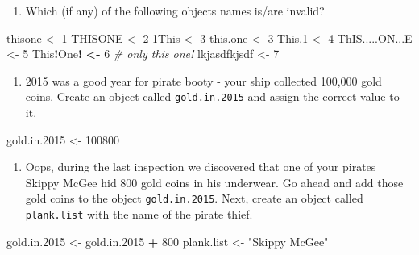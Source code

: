 \documentclass[]{book}
\newenvironment{Shaded}{\begin{snugshade}}{\end{snugshade}}
\newcommand{\DecValTok}[1]{\textcolor[rgb]{0.00,0.00,0.81}{#1}}
\newcommand{\StringTok}[1]{\textcolor[rgb]{0.31,0.60,0.02}{#1}}
\newcommand{\CommentTok}[1]{\textcolor[rgb]{0.56,0.35,0.01}{\textit{#1}}}
\newcommand{\OperatorTok}[1]{\textcolor[rgb]{0.81,0.36,0.00}{\textbf{#1}}}
\newcommand{\ErrorTok}[1]{\textcolor[rgb]{0.64,0.00,0.00}{\textbf{#1}}}
\newcommand{\NormalTok}[1]{#1}
\providecommand{\tightlist}{%
  \setlength{\itemsep}{0pt}\setlength{\parskip}{0pt}}
\theoremstyle{definition}
\theoremstyle{definition}
\theoremstyle{remark}
\begin{document}
\begin{enumerate}
\def\labelenumi{\arabic{enumi}.}
\setcounter{enumi}{1}
\tightlist
\item
  Which (if any) of the following objects names is/are invalid?
\end{enumerate}

\begin{Shaded}
\begin{Highlighting}[]
\NormalTok{thisone <-}\StringTok{ }\DecValTok{1}
\NormalTok{THISONE <-}\StringTok{ }\DecValTok{2}
\NormalTok{1This <-}\StringTok{ }\DecValTok{3}
\NormalTok{this.one <-}\StringTok{ }\DecValTok{3}
\NormalTok{This.}\DecValTok{1}\NormalTok{ <-}\StringTok{ }\DecValTok{4}
\NormalTok{ThIS.....ON...E <-}\StringTok{ }\DecValTok{5}
\NormalTok{This}\OperatorTok{!}\NormalTok{One}\OperatorTok{!}\StringTok{ }\ErrorTok{<}\OperatorTok{-}\StringTok{ }\DecValTok{6}           \CommentTok{# only this one!}
\NormalTok{lkjasdfkjsdf <-}\StringTok{ }\DecValTok{7}
\end{Highlighting}
\end{Shaded}

\begin{enumerate}
\def\labelenumi{\arabic{enumi}.}
\setcounter{enumi}{2}
\tightlist
\item
  2015 was a good year for pirate booty - your ship collected 100,000
  gold coins. Create an object called \texttt{gold.in.2015} and assign
  the correct value to it.
\end{enumerate}

\begin{Shaded}
\begin{Highlighting}[]
\NormalTok{gold.in.}\DecValTok{2015}\NormalTok{ <-}\StringTok{ }\DecValTok{100800}
\end{Highlighting}
\end{Shaded}

\begin{enumerate}
\def\labelenumi{\arabic{enumi}.}
\setcounter{enumi}{3}
\tightlist
\item
  Oops, during the last inspection we discovered that one of your
  pirates Skippy McGee hid 800 gold coins in his underwear. Go ahead and
  add those gold coins to the object \texttt{gold.in.2015}. Next, create
  an object called \texttt{plank.list} with the name of the pirate
  thief.
\end{enumerate}

\begin{Shaded}
\begin{Highlighting}[]
\NormalTok{gold.in.}\DecValTok{2015}\NormalTok{ <-}\StringTok{ }\NormalTok{gold.in.}\DecValTok{2015} \OperatorTok{+}\StringTok{ }\DecValTok{800}
\NormalTok{plank.list <-}\StringTok{ "Skippy McGee"}
\end{Highlighting}
\end{Shaded}
\end{document}
